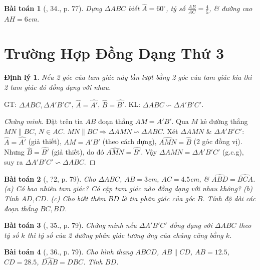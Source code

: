 \documentclass{article}
\newtheorem{baitoan}{Bài toán}
\newtheorem{dinhly}{Định lý}
\begin{document}
\begin{baitoan}[\cite{SGK_Toan_8_tap_2}, 34., p. 77]
	Dựng $\Delta ABC$ biết $\widehat{A} = 60^\circ$, tỷ số $\frac{AB}{AC} = \frac{4}{5}$, \& đường cao $AH = 6$\emph{cm}.
\end{baitoan}


\section{Trường Hợp Đồng Dạng Thứ 3}

\begin{dinhly}
	Nếu 2 góc của tam giác này lần lượt bằng 2 góc của tam giác kia thì 2 tam giác đó đồng dạng với nhau.
\end{dinhly}
GT: $\Delta ABC,\Delta A'B'C'$, $\widehat{A} = \widehat{A'}$, $\widehat{B} = \widehat{B'}$. KL: $\Delta ABC\backsim\Delta A'B'C'$.

\begin{proof}[Chứng minh]
	Đặt trên tia $AB$ đoạn thẳng $AM = A'B'$. Qua $M$ kẻ đường thẳng $MN\parallel BC$, $N\in AC$. $MN\parallel BC\Rightarrow\Delta AMN\backsim\Delta ABC$. Xét $\Delta AMN$ \& $\Delta A'B'C'$: $\widehat{A} = \widehat{A'}$ (giả thiết), $AM = A'B'$ (theo cách dựng), $\widehat{AMN} = \widehat{B}$ (2 góc đồng vị). Nhưng $\widehat{B} = \widehat{B'}$ (giả thiết), do đó $\widehat{AMN} = \widehat{B'}$. Vậy $\Delta AMN = \Delta A'B'C'$ (g.c.g), suy ra $\Delta A'B'C'\backsim\Delta ABC$.
\end{proof}

\begin{baitoan}[\cite{SGK_Toan_8_tap_2}, ?2, p. 79]
	Cho $\Delta ABC$, $AB = 3$\emph{cm}, $AC = 4.5$\emph{cm}, \& $\widehat{ABD} = \widehat{BCA}$. (a) Có bao nhiêu tam giác? Có cặp tam giác nào đồng dạng với nhau không? (b) Tính $AD,CD$. (c) Cho biết thêm $BD$ là tia phân giác của góc $B$. Tính độ dài các đoạn thẳng $BC,BD$.
\end{baitoan}

\begin{baitoan}[\cite{SGK_Toan_8_tap_2}, 35., p. 79]
	Chứng minh nếu $\Delta A'B'C'$ đồng dạng với $\Delta ABC$ theo tỷ số $k$ thì tỷ số của 2 đường phân giác tương ứng của chúng cũng bằng $k$.
\end{baitoan}

\begin{baitoan}[\cite{SGK_Toan_8_tap_2}, 36., p. 79]
	Cho hình thang $ABCD$, $AB\parallel CD$, $AB = 12.5$, $CD = 28.5$, $\widehat{DAB} = \widehat{DBC}$. Tính $BD$.
\end{baitoan}
\end{document}
